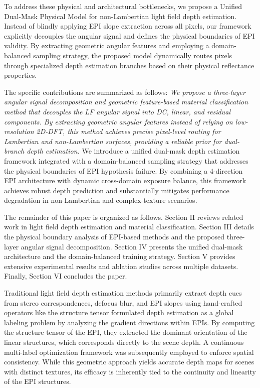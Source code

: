 To address these physical and architectural bottlenecks, we propose a Unified Dual-Mask Physical Model for non-Lambertian light field depth estimation. Instead of blindly applying EPI slope extraction across all pixels, our framework explicitly decouples the angular signal and defines the physical boundaries of EPI validity. By extracting geometric angular features and employing a domain-balanced sampling strategy, the proposed model dynamically routes pixels through specialized depth estimation branches based on their physical reflectance properties.

The specific contributions are summarized as follows:
\textit{ We propose a three-layer angular signal decomposition and geometric feature-based material classification method that decouples the LF angular signal into DC, linear, and residual components. By extracting geometric angular features instead of relying on low-resolution 2D-DFT, this method achieves precise pixel-level routing for Lambertian and non-Lambertian surfaces, providing a reliable prior for dual-branch depth estimation.
} We introduce a unified dual-mask depth estimation framework integrated with a domain-balanced sampling strategy that addresses the physical boundaries of EPI hypothesis failure. By combining a 4-direction EPI architecture with dynamic cross-domain exposure balance, this framework achieves robust depth prediction and substantially mitigates performance degradation in non-Lambertian and complex-texture scenarios.

The remainder of this paper is organized as follows. Section II reviews related work in light field depth estimation and material classification. Section III details the physical boundary analysis of EPI-based methods and the proposed three-layer angular signal decomposition. Section IV presents the unified dual-mask architecture and the domain-balanced training strategy. Section V provides extensive experimental results and ablation studies across multiple datasets. Finally, Section VI concludes the paper.

Traditional light field depth estimation methods primarily extract depth cues from stereo correspondences, defocus blur, and EPI slopes using hand-crafted operators like the structure tensor formulated depth estimation as a global labeling problem by analyzing the gradient directions within EPIs. By computing the structure tensor of the EPI, they extracted the dominant orientation of the linear structures, which corresponds directly to the scene depth. A continuous multi-label optimization framework was subsequently employed to enforce spatial consistency. While this geometric approach yields accurate depth maps for scenes with distinct textures, its efficacy is inherently tied to the continuity and linearity of the EPI structures.

